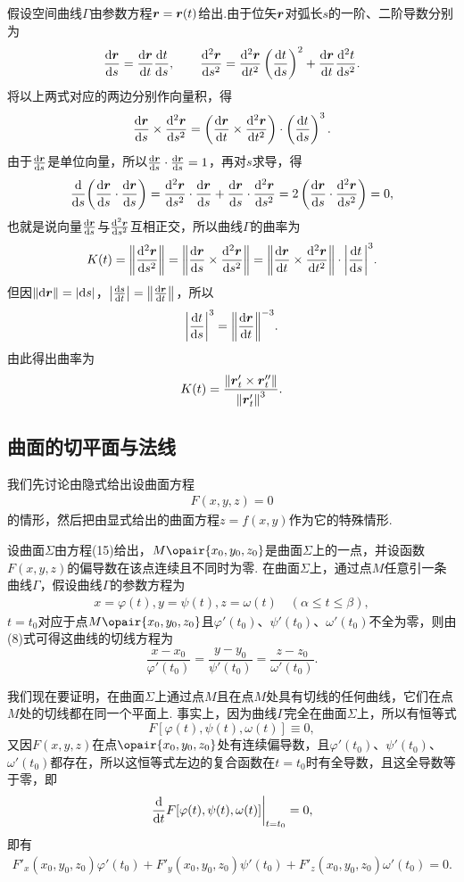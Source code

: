 假设空间曲线\(\Gamma\)由参数方程\(\boldsymbol{r} = \boldsymbol{r}(t)\)给出.由于位矢\(\boldsymbol{r}\)对弧长\(s\)的一阶、二阶导数分别为\[
\dv{\boldsymbol{r}}{s} = \dv{\boldsymbol{r}}{t} \dv{t}{s},
\qquad
\dv[2]{\boldsymbol{r}}{s} = \dv[2]{\boldsymbol{r}}{t} \left(\dv{t}{s}\right)^2 + \dv{\boldsymbol{r}}{t} \dv[2]{t}{s}.
\]将以上两式对应的两边分别作向量积，得\[
\dv{\boldsymbol{r}}{s} \times \dv[2]{\boldsymbol{r}}{s}
= \left(\dv{\boldsymbol{r}}{t} \times \dv[2]{\boldsymbol{r}}{t}\right) \cdot \left(\dv{t}{s}\right)^3.
\]由于\(\dv{\boldsymbol{r}}{s}\)是单位向量，所以\(\dv{\boldsymbol{r}}{s} \cdot \dv{\boldsymbol{r}}{s} = 1\)，再对\(s\)求导，得\[
\dv{s}( \dv{\boldsymbol{r}}{s} \cdot \dv{\boldsymbol{r}}{s} )
= \dv[2]{\boldsymbol{r}}{s} \cdot \dv{\boldsymbol{r}}{s} + \dv{\boldsymbol{r}}{s} \cdot \dv[2]{\boldsymbol{r}}{s}
= 2 \left( \dv{\boldsymbol{r}}{s} \cdot \dv[2]{\boldsymbol{r}}{s} \right)
= 0,
\]也就是说向量\(\dv{\boldsymbol{r}}{s}\)与\(\dv[2]{\boldsymbol{r}}{s}\)互相正交，所以曲线\(\Gamma\)的曲率为\[
K(t) = \norm{ \dv[2]{\boldsymbol{r}}{s} }
= \norm{ \dv{\boldsymbol{r}}{s} \times \dv[2]{\boldsymbol{r}}{s} }
= \norm{ \dv{\boldsymbol{r}}{t} \times \dv[2]{\boldsymbol{r}}{t} } \cdot \abs{ \dv{t}{s} }^3.
\]但因\(\norm{ \dd{\boldsymbol{r}} } = \abs{ \dd{s} }\)，\(\abs{ \dv{s}{t} } = \norm{ \dv{\boldsymbol{r}}{t} }\)，所以\[
\abs{ \dv{t}{s} }^3 = \norm{ \dv{\boldsymbol{r}}{t} }^{-3}.
\]由此得出曲率为\begin{equation}
K(t) = \frac{ \norm{ \boldsymbol{r}'_t \times \boldsymbol{r}''_t } }{ \norm{ \boldsymbol{r}'_t }^3 }.
\end{equation}

\subsection{曲面的切平面与法线}
我们先讨论由隐式给出设曲面方程\begin{gather}
F(x,y,z)=0
\tag{15}
\end{gather}的情形，然后把由显式给出的曲面方程\(z = f(x,y)\)作为它的特殊情形.

设曲面\(\Sigma\)由方程(15)给出，\(M\opair{x_0,y_0,z_0}\)是曲面\(\Sigma\)上的一点，并设函数\(F(x,y,z)\)的偏导数在该点连续且不同时为零.
在曲面\(\Sigma\)上，通过点\(M\)任意引一条曲线\(\Gamma\)，假设曲线\(\Gamma\)的参数方程为\begin{gather}
x = \varphi(t),
y = \psi(t),
z = \omega(t)
\quad (\alpha \leq t \leq \beta),
\tag{16}
\end{gather}
\(t = t_0\)对应于点\(M\opair{x_0,y_0,z_0}\)且\(\varphi'(t_0)\)、\(\psi'(t_0)\)、\(\omega'(t_0)\)不全为零，则由(8)式可得这曲线的切线方程为\[
\frac{x-x_0}{\varphi'(t_0)}
=\frac{y-y_0}{\psi'(t_0)}
=\frac{z-z_0}{\omega'(t_0)}.
\]

我们现在要证明，在曲面\(\Sigma\)上通过点\(M\)且在点\(M\)处具有切线的任何曲线，它们在点\(M\)处的切线都在同一个平面上.
事实上，因为曲线\(\Gamma\)完全在曲面\(\Sigma\)上，所以有恒等式\[
F[\varphi(t),\psi(t),\omega(t)] \equiv 0,
\]又因\(F(x,y,z)\)在点\(\opair{x_0,y_0,z_0}\)处有连续偏导数，且\(\varphi'(t_0)\)、\(\psi'(t_0)\)、\(\omega'(t_0)\)都存在，所以这恒等式左边的复合函数在\(t = t_0\)时有全导数，且这全导数等于零，即\[
\eval{\dv{t} F[\varphi(t),\psi(t),\omega(t)]}_{t=t_0} = 0,
\]即有\begin{gather}
F'_x(x_0,y_0,z_0) \varphi'(t_0)
+ F'_y(x_0,y_0,z_0) \psi'(t_0)
+ F'_z(x_0,y_0,z_0) \omega'(t_0)
= 0.
\tag{17}
\end{gather}

